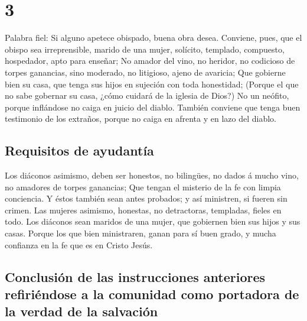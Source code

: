\hypertarget{section-2}{%
\section{3}\label{section-2}}

 Palabra fiel: Si alguno apetece obispado, buena obra
desea.  Conviene, pues, que el obispo sea irreprensible,
marido de una mujer, solícito, templado, compuesto, hospedador, apto
para enseñar;  No amador del vino, no heridor, no
codicioso de torpes ganancias, sino moderado, no litigioso, ajeno de
avaricia;  Que gobierne bien su casa, que tenga sus hijos
en sujeción con toda honestidad;  (Porque el que no sabe
gobernar su casa, ¿cómo cuidará de la iglesia de Dios?) 
No un neófito, porque inflándose no caiga en juicio del diablo.
 También conviene que tenga buen testimonio de los
extraños, porque no caiga en afrenta y en lazo del diablo.

\hypertarget{requisitos-de-ayudantuxeda}{%
\subsection{Requisitos de ayudantía}\label{requisitos-de-ayudantuxeda}}

 Los diáconos asimismo, deben ser honestos, no bilingües,
no dados á mucho vino, no amadores de torpes ganancias; 
Que tengan el misterio de la fe con limpia conciencia.  Y
éstos también sean antes probados; y así ministren, si fueren sin
crimen.  Las mujeres asimismo, honestas, no detractoras,
templadas, fieles en todo.  Los diáconos sean maridos de
una mujer, que gobiernen bien sus hijos y sus casas. 
Porque los que bien ministraren, ganan para sí buen grado, y mucha
confianza en la fe que es en Cristo Jesús.

\hypertarget{conclusiuxf3n-de-las-instrucciones-anteriores-refiriuxe9ndose-a-la-comunidad-como-portadora-de-la-verdad-de-la-salvaciuxf3n}{%
\subsection{Conclusión de las instrucciones anteriores refiriéndose a la
comunidad como portadora de la verdad de la
salvación}\label{conclusiuxf3n-de-las-instrucciones-anteriores-refiriuxe9ndose-a-la-comunidad-como-portadora-de-la-verdad-de-la-salvaciuxf3n}}

